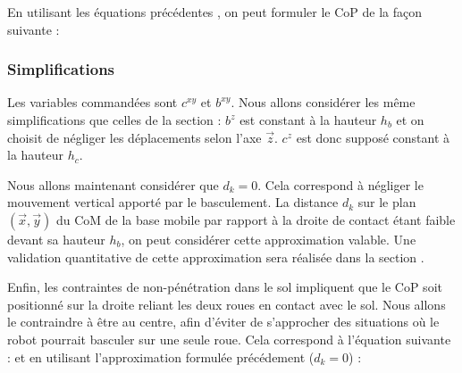 				En utilisant les équations précédentes , on peut formuler le CoP de la façon suivante :	
				
			\subsubsection{Simplifications}
				
				Les variables commandées sont $c^{xy}$ et $b^{xy}$. Nous allons considérer les même simplifications que celles de la section  :
				$b^z$ est constant à la hauteur $h_b$ et on choisit de négliger les déplacements selon l'axe $\vec{z}$. $c^z$ est donc supposé constant à la hauteur $h_c$.
				
				Nous allons maintenant considérer que $d_k=0$. Cela correspond à négliger le mouvement vertical apporté par le basculement. 
				La distance $d_k$ sur le plan $(\vec{x},\vec{y})$ du CoM de la base mobile par rapport à la droite de contact étant faible devant sa hauteur $h_b$, on peut considérer cette approximation valable. 
				Une validation quantitative de cette approximation sera réalisée dans la section .
				
				Enfin, les contraintes de non-pénétration dans le sol impliquent que le CoP soit positionné sur la droite reliant les deux roues en contact avec le sol.
				Nous allons le contraindre à être au centre, afin d'éviter de s'approcher des situations où le robot pourrait basculer sur une seule roue.
				Cela correspond à l'équation suivante :
				et en utilisant l'approximation formulée précédement ($d_k=0$) :
				
